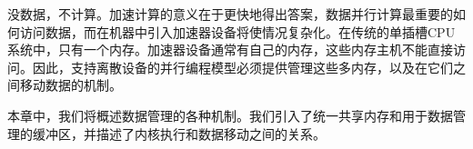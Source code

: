 没数据，不计算。加速计算的意义在于更快地得出答案，数据并行计算最重要的如何访问数据，而在机器中引入加速器设备将使情况复杂化。在传统的单插槽CPU系统中，只有一个内存。加速器设备通常有自己的内存，这些内存主机不能直接访问。因此，支持离散设备的并行编程模型必须提供管理这些多内存，以及在它们之间移动数据的机制。\par

本章中，我们将概述数据管理的各种机制。我们引入了统一共享内存和用于数据管理的缓冲区，并描述了内核执行和数据移动之间的关系。\par












